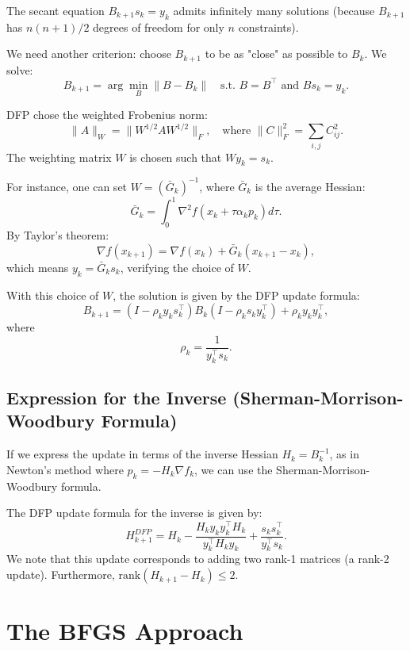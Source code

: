 The secant equation $B_{k+1} s_k = y_k$ admits infinitely many solutions (because $B_{k+1}$ has $n(n+1)/2$ degrees of freedom for only $n$ constraints).

We need another criterion: choose $B_{k+1}$ to be as "close" as possible to $B_k$.
We solve:
\begin{equation}
    B_{k+1} = \arg\min_B \|B - B_k\| \quad \text{s.t. } B=B^\top \text{ and } B s_k = y_k.
\end{equation}

DFP chose the weighted Frobenius norm:
\[
    \|A\|_W = \|W^{1/2} A W^{1/2}\|_F, \quad \text{where } \|C\|_F^2 = \sum_{i,j} C_{ij}^2.
\]
The weighting matrix $W$ is chosen such that $W y_k = s_k$.

For instance, one can set $W = (\bar{G}_k)^{-1}$, where $\bar{G}_k$ is the average Hessian:
\[
    \bar{G}_k = \int_0^1 \nabla^2 f(x_k + \tau \alpha_k p_k) d\tau.
\]
By Taylor's theorem:
\[
    \nabla f(x_{k+1}) = \nabla f(x_k) + \bar{G}_k (x_{k+1} - x_k),
\]
which means $y_k = \bar{G}_k s_k$, verifying the choice of $W$.

With this choice of $W$, the solution is given by the DFP update formula:
\begin{equation}
    \label{eq:dfp-formula}
    B_{k+1} = (I - \rho_k y_k s_k^\top) B_k (I - \rho_k s_k y_k^\top) + \rho_k y_k y_k^\top,
\end{equation}
where
\begin{equation}
    \rho_k = \frac{1}{y_k^\top s_k}.
\end{equation}

\subsection{Expression for the Inverse (Sherman-Morrison-Woodbury Formula)}

If we express the update in terms of the inverse Hessian $H_k = B_k^{-1}$, as in Newton's method where $p_k = -H_k \nabla f_k$, we can use the Sherman-Morrison-Woodbury formula.

The DFP update formula for the inverse is given by:
\begin{equation}
    H_{k+1}^{DFP} = H_k - \frac{H_k y_k y_k^\top H_k}{y_k^\top H_k y_k} + \frac{s_k s_k^\top}{y_k^\top s_k}.
\end{equation}
We note that this update corresponds to adding two rank-1 matrices (a rank-2 update).
Furthermore, $\text{rank}(H_{k+1} - H_k) \le 2$.

\section{The BFGS Approach}
\label{sec:bfgs_approach}

